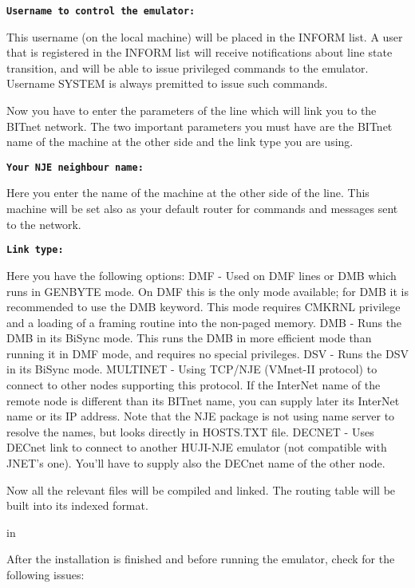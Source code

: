 {\tt\bf Username to control the emulator:}

This  username (on the local machine) will be placed in the INFORM list.
A user that is registered in the INFORM list will receive  notifications
about  line  state  transition,  and  will  be  able to issue privileged
commands to the emulator. Username SYSTEM is always premitted  to  issue
such commands.

Now  you have to enter the parameters of the line which will link you to
the BITnet network. The two important parameters you must have  are  the
BITnet  name  of the machine at the other side and the link type you are
using.

{\tt \bf Your NJE neighbour name:}

Here you enter the name of the machine at the other side  of  the  line.
This  machine  will  be set also as your default router for commands and
messages sent to the network.

{\tt\bf Link type:}

Here you have the following options:
\hfill\break
{\ncrBold DMF} - Used on DMF lines or DMB which runs in GENBYTE mode.
On  DMF  this
is  the  only  mode  available; for DMB it is recommended to use the DMB
keyword. This mode requires CMKRNL privilege and a loading of a  framing
routine into the non-paged memory.
\hfill\break
{\ncrBold DMB}  -  Runs  the  DMB  in  its  BiSync  mode. This
runs the DMB in more
efficient mode than running it in DMF  mode,  and  requires  no  special
privileges.
\hfill\break
{\ncrBold DSV}  -  Runs  the  DSV in  its  BiSync  mode.
\hfill\break
{\ncrBold MULTINET}  -  Using TCP/NJE (VMnet-II protocol) to connect 
to other nodes
supporting this protocol. If the InterNet name of  the  remote  node  is
different  than  its BITnet name, you can supply later its InterNet name
or its IP address. Note that the NJE package is not using name server to
resolve the names, but looks directly in HOSTS.TXT file.
\hfill\break
{\ncrBold DECNET} -  Uses DECnet link to connect to another HUJI-NJE emulator
(not
compatible with JNET's one). You'll have to supply also the DECnet  name
of the other node.

Now  all  the  relevant  files  will be compiled and linked. The routing
table will be built into its indexed format.

 in

After the installation is finished and before running  the  emulator,
check for the following issues:

